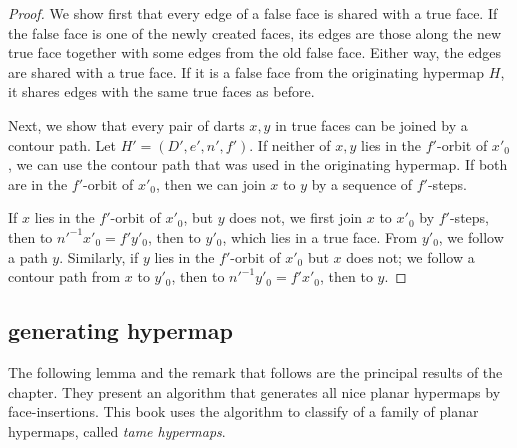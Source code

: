 \begin{proof}  We show first that every edge of a false face is shared
with a true face.  If the false face is one of the newly created
faces, its edges are those along the new true face together
with some edges from the old false
face. Either way, the edges are shared with a true face.   If it is a
false face from the originating hypermap $H$, 
it shares edges with the
same true faces as before.

Next, we show that every pair of darts $x,y$ in true faces can be
joined by a contour path.  Let $H'=(D',e',n',f')$.  
If neither of $x,y$ lies in the
$f'$-orbit of $x'_0$, we can use the contour path that was used in the
originating hypermap.  If both are in the $f'$-orbit of $x'_0$, then
we can join $x$ to $y$ by a sequence of $f'$-steps.

If $x$ lies in the $f'$-orbit of $x'_0$, but $y$ does not, 
we first join $x$
to $x'_0$ by $f'$-steps, then to $n'^{-1} x'_0= f' y'_0$, then to $y'_0$,
which lies in a true face.
From $y'_0$, we follow a path $y$.
Similarly, if $y$ lies in the $f'$-orbit of $x'_0$ but $x$ does not; 
we follow a contour path from $x$ to $y'_0$, then to $n'^{-1} y'_0 = f'
x'_0$, then to $y$.
\end{proof}

\subsection{generating hypermap}

The following lemma
and the remark that follows are the principal results of the
chapter.  They present an algorithm that 
generates all nice planar hypermaps by face-insertions.
This book uses the algorithm to classify of a family of
planar hypermaps, called {\it tame hypermaps}.

